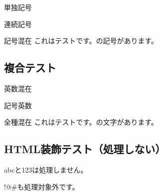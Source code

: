 単独記号\tatechuyoko*{:} \tatechuyoko*{!} 
\tatechuyoko*{#} \tatechuyoko*{$}

連続記号\tatechuyoko*{:} {\small\tatechuyoko*{!!}}
{\small{}} {\small\tatechuyoko*{##}}
{\small\tatechuyoko*{$$}}

記号混在\tatechuyoko*{:}
これは\tatechuyoko*{!}テストです。\tatechuyoko*{#}の記号\tatechuyoko*{$}があります。

\hypertarget{ux8907ux5408ux30c6ux30b9ux30c8}{%
\subsection{複合テスト}\label{ux8907ux5408ux30c6ux30b9ux30c8}}

英数混在\tatechuyoko*{:} 
 

記号英数\tatechuyoko*{:} \tatechuyoko*{!}
 \tatechuyoko*{#}
\tatechuyoko*{$}

全種混在\tatechuyoko*{:}
これは\tatechuyoko*{!}テストです。\tatechuyoko*{#}の文字\tatechuyoko*{$}があります。

\hypertarget{htmlux88c5ux98feux30c6ux30b9ux30c8ux51e6ux7406ux3057ux306aux3044}{%
\subsection{HTML装飾テスト（処理しない）}\label{htmlux88c5ux98feux30c6ux30b9ux30c8ux51e6ux7406ux3057ux306aux3044}}

{abc}と{123}は処理しません。

{!@\#}も処理対象外です。